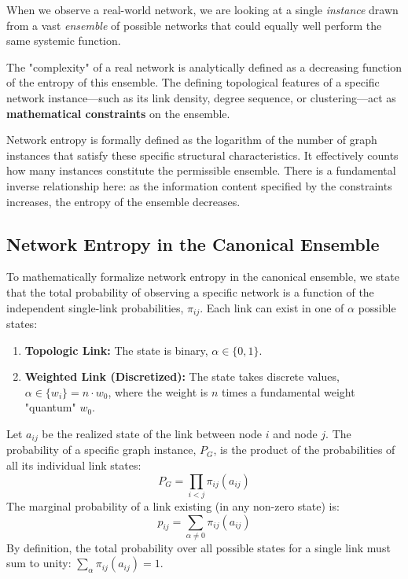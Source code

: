 When we observe a real-world network, we are looking at a single \textit{instance} drawn from a vast \textit{ensemble} of possible networks that could equally well perform the same systemic function.

The "complexity" of a real network is analytically defined as a decreasing function of the entropy of this ensemble. The defining topological features of a specific network instance—such as its link density, degree sequence, or clustering—act as \textbf{mathematical constraints} on the ensemble.

Network entropy is formally defined as the logarithm of the number of graph instances that satisfy these specific structural characteristics. It effectively counts how many instances constitute the permissible ensemble. There is a fundamental inverse relationship here: as the information content specified by the constraints increases, the entropy of the ensemble decreases.


\subsection{Network Entropy in the Canonical Ensemble}
\label{subsec:canonical_entropy}

To mathematically formalize network entropy in the canonical ensemble, we state that the total probability of observing a specific network is a function of the independent single-link probabilities, \(\pi_{ij}\). Each link can exist in one of \(\alpha\) possible states:
\begin{enumerate}
    \item \textbf{Topologic Link:} The state is binary, \(\alpha \in \{0, 1\}\).
    \item \textbf{Weighted Link (Discretized):} The state takes discrete values, \(\alpha \in \{w_i\} = n \cdot w_0\), where the weight is \(n\) times a fundamental weight "quantum" \(w_0\).
\end{enumerate}

Let \(a_{ij}\) be the realized state of the link between node \(i\) and node \(j\). The probability of a specific graph instance, \(P_G\), is the product of the probabilities of all its individual link states:
\[
    P_G = \prod_{i<j} \pi_{ij}(a_{ij})
\]
The marginal probability of a link existing (in any non-zero state) is:
\[
    p_{ij} = \sum_{\alpha \neq 0} \pi_{ij}(a_{ij})
\]
By definition, the total probability over all possible states for a single link must sum to unity: \(\sum_{\alpha} \pi_{ij}(a_{ij}) = 1\).

